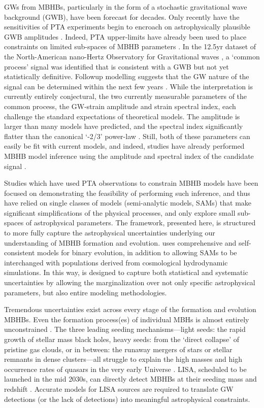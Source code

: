 \documentclass[useAMS, usenatbib]{src/mnras}
\begin{document}
    GWs from MBHBs, particularly in the form of a stochastic gravitational wave background (GWB), have been forecast for decades.  Only recently have the sensitivities of PTA experiments begin to encroach on astrophysically plausible GWB amplitudes  .  Indeed, PTA upper-limits have already been used to place constraints on limited sub-spaces of MBHB parameters .  In the 12.5yr dataset of the North-American nano-Hertz Observatory for Gravitational waves , a `common process' signal was identified that is consistent with a GWB but not yet statistically definitive.  Followup modelling suggests that the GW nature of the signal can be determined within the next few years .  While the interpretation is currently entirely conjectural, the two currently measurable parameters of the common process, the GW-strain amplitude and strain spectral index, each challenge the standard expectations of theoretical models.  The  amplitude is larger than many models have predicted, and the spectral index significantly flatter than the canonical `-2/3' power-law  .  Still, both of these parameters can easily be fit with current models, and indeed, studies have already performed MBHB model inference using the amplitude and spectral index of the candidate  signal .

    Studies which have used PTA observations to constrain MBHB models have been focused on demonstrating the feasibility of performing such inference, and thus have relied on single classes of models (semi-analytic models, SAMs) that make significant simplifications of the physical processes, and only explore small sub-spaces of astrophysical parameters.  The \holodeck{} framework, presented here, is structured to more fully capture the astrophysical uncertainties underlying our understanding of MBHB formation and evolution.  \holodeck{} uses comprehensive and self-consistent models for binary evolution, in addition to allowing SAMs to be interchanged with populations derived from cosmological hydrodynamic simulations.  In this way, \holodeck{} is designed to capture both statistical and systematic uncertainties by allowing the marginalization over not only specific astrophysical parameters, but also entire modeling methodologies.

    Tremendous uncertainties exist across every stage of the formation and evolution MBHBs.  Even the formation process(es) of individual MBHs is almost entirely unconstrained \needcite{}.  The three leading seeding mechanisms---light seeds: the rapid growth of stellar mass black holes, heavy seeds: from the `direct collapse' of pristine gas clouds, or in between: the runaway mergers of stars or stellar remnants in dense clusters---all struggle to explain the high masses and high occurrence rates of quasars in the very early Universe \needcite{}.  LISA, scheduled to be launched in the mid 2030s, can directly detect MBHBs at their seeding mass and redshift \needcite{}.  Accurate models for LISA sources are required to translate GW detections (or the lack of detections) into meaningful astrophysical constraints.
\end{document}
